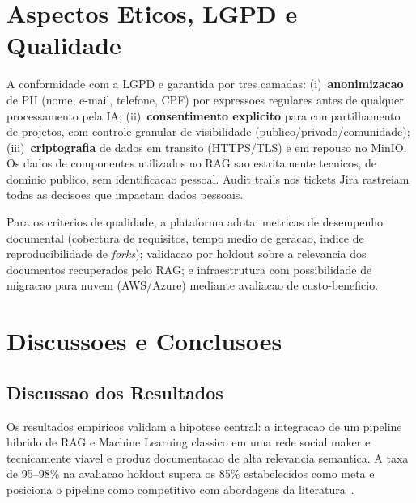 \documentclass[portuguese]{sbcreviews-2025}%
\begin{document}
\section{Aspectos Eticos, LGPD e Qualidade}

A conformidade com a LGPD e garantida por tres camadas: (i)~\textbf{anonimizacao} de PII (nome, e-mail, telefone, CPF) por expressoes regulares antes de qualquer processamento pela IA; (ii)~\textbf{consentimento explicito} para compartilhamento de projetos, com controle granular de visibilidade (publico/privado/comunidade); (iii)~\textbf{criptografia} de dados em transito (HTTPS/TLS) e em repouso no MinIO. Os dados de componentes utilizados no RAG sao estritamente tecnicos, de dominio publico, sem identificacao pessoal. Audit trails nos tickets Jira rastreiam todas as decisoes que impactam dados pessoais.

Para os criterios de qualidade, a plataforma adota: metricas de desempenho documental (cobertura de requisitos, tempo medio de geracao, indice de reproducibilidade de \textit{forks}); validacao por holdout sobre a relevancia dos documentos recuperados pelo RAG; e infraestrutura com possibilidade de migracao para nuvem (AWS/Azure) mediante avaliacao de custo-beneficio.

\section{Discussoes e Conclusoes}

\subsection{Discussao dos Resultados}

Os resultados empiricos validam a hipotese central: a integracao de um pipeline hibrido de RAG e Machine Learning classico em uma rede social maker e tecnicamente viavel e produz documentacao de alta relevancia semantica. A taxa de 95--98\% na avaliacao holdout supera os 85\% estabelecidos como meta e posiciona o pipeline como competitivo com abordagens da literatura~\cite{dong2025chatiot}.
\end{document}
